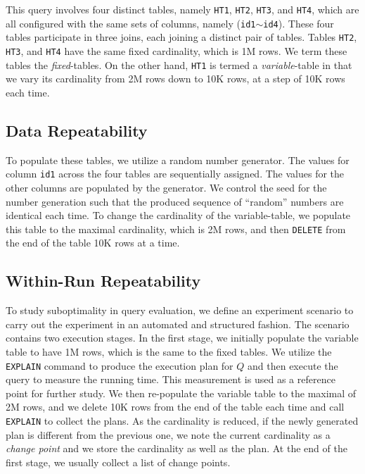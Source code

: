 
This query involves four distinct tables, namely {\tt HT1}, {\tt HT2},
{\tt HT3}, and {\tt HT4}, which are all configured with the same sets of
columns, namely ({\tt id1}$\sim${\tt id4}). These four tables participate
in three joins, each joining a distinct pair of tables.
Tables {\tt HT2}, {\tt HT3}, and {\tt HT4} have the same fixed cardinality,
which is 1M rows. We term these tables the {\em fixed}-tables.
On the other hand, {\tt HT1} is termed a {\em variable}-table in that we
vary its cardinality from 2M rows down to 10K rows, at a step of 10K rows
each time.

\subsection{Data Repeatability}
To populate these tables, we utilize a random number generator. The values
for column {\tt id1} across the four tables are sequentially assigned.
The values for the other columns are populated by the generator. We control
the seed for the number generation such that the produced sequence of
``random'' numbers are identical each time. To change the cardinality of
the variable-table, we populate this table to the maximal cardinality,
which is 2M rows, and then {\tt DELETE} from the end of the table 10K rows
at a time.

\subsection{Within-Run Repeatability}
To study suboptimality in query evaluation, we define an experiment scenario
to carry out the experiment in an automated and structured fashion.
The scenario contains two execution stages.
In the first stage, we initially populate the variable table to have 1M rows,
which is the same to the fixed tables. We utilize the {\tt EXPLAIN} command
to produce the execution plan for $Q$ and then execute the query to measure
the running time. This measurement is used as a reference point for further
study.
We then re-populate the variable table to the maximal of 2M rows, and we delete
10K rows from the end of the table each time and call {\tt EXPLAIN} to
collect the plans. As the cardinality is reduced, if the newly generated plan
is different from the previous one, we note the current cardinality as a
{\em change point} and we store the cardinality as well as the plan. At the
end of the first stage, we usually collect a list of change points.

